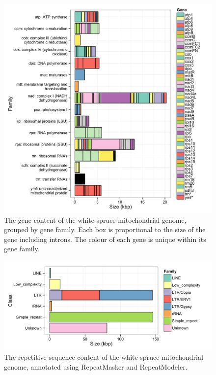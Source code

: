 \documentclass[
  12pt,
  oneside,
  openany]{book}
\begin{document}
\begin{figure}
\hypertarget{fig:mtgenefamilies}{%
\centering
\includegraphics{whitespruce/mt-genes.png}
\caption[The gene content of the white spruce mitochondrial genome, grouped by gene family.]{The gene content of the white spruce mitochondrial genome, grouped by gene family. Each box is proportional to the size of the gene including introns. The colour of each gene is unique within its gene family.}\label{fig:mtgenefamilies}
}
\end{figure}

\begin{figure}
\hypertarget{fig:mtrepeats}{%
\centering
\includegraphics{whitespruce/mt-repeats.png}
\caption[The repetitive sequence content of the white spruce mitochondrial genome, annotated using RepeatMasker and RepeatModeler.]{The repetitive sequence content of the white spruce mitochondrial genome, annotated using RepeatMasker and RepeatModeler.}\label{fig:mtrepeats}
}
\end{figure}
\end{document}
